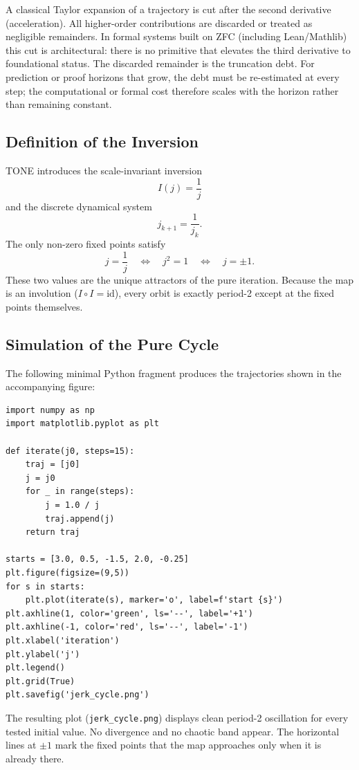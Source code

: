\documentclass[11pt,a4paper]{article}
\begin{document}
A classical Taylor expansion of a trajectory is cut after the second derivative (acceleration). All higher-order contributions are discarded or treated as negligible remainders. In formal systems built on ZFC (including Lean/Mathlib) this cut is architectural: there is no primitive that elevates the third derivative to foundational status. The discarded remainder is the truncation debt. For prediction or proof horizons that grow, the debt must be re-estimated at every step; the computational or formal cost therefore scales with the horizon rather than remaining constant.

\subsection{Definition of the Inversion}

TONE introduces the scale-invariant inversion
\[
I(j)=\frac{1}{j}
\]
and the discrete dynamical system
\[
j_{k+1}=\frac{1}{j_k}.
\]
The only non-zero fixed points satisfy
\[
j=\frac{1}{j}\quad\Leftrightarrow\quad j^2=1\quad\Leftrightarrow\quad j=\pm 1.
\]
These two values are the unique attractors of the pure iteration. Because the map is an involution (\(I\circ I=\mathrm{id}\)), every orbit is exactly period-2 except at the fixed points themselves.

\subsection{Simulation of the Pure Cycle}

The following minimal Python fragment produces the trajectories shown in the accompanying figure:

\begin{lstlisting}
import numpy as np
import matplotlib.pyplot as plt

def iterate(j0, steps=15):
    traj = [j0]
    j = j0
    for _ in range(steps):
        j = 1.0 / j
        traj.append(j)
    return traj

starts = [3.0, 0.5, -1.5, 2.0, -0.25]
plt.figure(figsize=(9,5))
for s in starts:
    plt.plot(iterate(s), marker='o', label=f'start {s}')
plt.axhline(1, color='green', ls='--', label='+1')
plt.axhline(-1, color='red', ls='--', label='-1')
plt.xlabel('iteration')
plt.ylabel('j')
plt.legend()
plt.grid(True)
plt.savefig('jerk_cycle.png')
\end{lstlisting}

The resulting plot (\texttt{jerk\_cycle.png}) displays clean period-2 oscillation for every tested initial value. No divergence and no chaotic band appear. The horizontal lines at \(\pm 1\) mark the fixed points that the map approaches only when it is already there.
\end{document}
